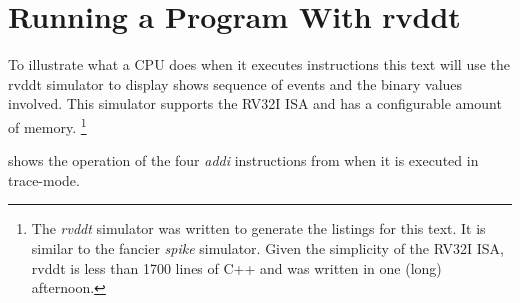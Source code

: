 \section{Running a Program With rvddt}

To illustrate what a CPU does when it executes instructions this text
will use the \gls{rvddt} simulator to display shows sequence of events 
and the binary values involved.  This simulator supports the RV32I ISA 
and has a configurable amount of memory.%
\footnote{The {\em rvddt} simulator was written to generate the listings for 
this text.  It is similar to the fancier {\em spike} simulator.  
Given the simplicity of the RV32I ISA, rvddt is less than 1700 lines of C++ 
and was written in one (long) afternoon.}

 shows the operation of the four 
{\em addi} instructions from  when it is executed
in trace-mode.


